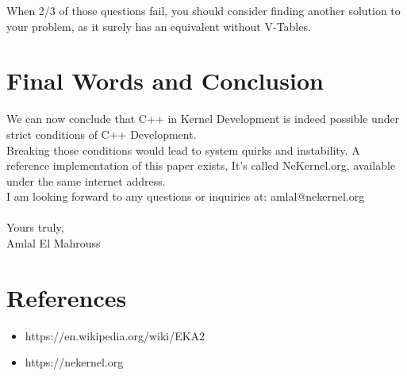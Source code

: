 \documentclass{article}
\begin{document}
When 2/3 of those questions fail, you should consider finding another solution to your problem, as it surely has an equivalent without V-Tables.

\section{Final Words and Conclusion}
{
We can now conclude that C++ in Kernel Development is indeed possible under strict conditions of C++ Development. \\
Breaking those conditions would lead to system quirks and instability.
A reference implementation of this paper exists, It's called NeKernel.org, available under the same internet address. \\
I am looking forward to any questions or inquiries at: amlal@nekernel.org \\\\Yours truly, \\
Amlal El Mahrouss
}

\section{References}
{
\begin{itemize}
    \item[EKA2:] https://en.wikipedia.org/wiki/EKA2
    \item[NeKernel.org:] https://nekernel.org
\end{itemize}
}
\end{document}
